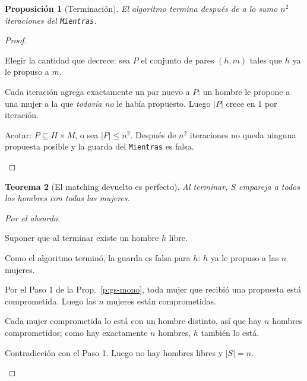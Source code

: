 \documentclass[11pt,a4paper]{article}
\theoremstyle{plain}
\newtheorem{teorema}{Teorema}[section]
\newtheorem{proposicion}[teorema]{Proposición}
\theoremstyle{definition}
\theoremstyle{remark}
\begin{document}
\begin{proposicion}[Terminación]
El algoritmo termina después de a lo sumo $n^2$ iteraciones del \texttt{Mientras}.
\end{proposicion}
\begin{proof}
\begin{pasos}
\item Elegir la cantidad que decrece: sea $P$ el conjunto de pares $(h,m)$ tales que $h$
ya le propuso a $m$.
\item Cada iteración agrega exactamente un par nuevo a $P$: un hombre le propone a una
mujer a la que \emph{todavía no} le había propuesto. Luego $|P|$ crece en $1$ por
iteración.
\item Acotar: $P\subseteq H\times M$, o sea $|P|\le n^2$. Después de $n^2$ iteraciones
no queda ninguna propuesta posible y la guarda del \texttt{Mientras} es falsa. \qedhere
\end{pasos}
\end{proof}

\begin{teorema}[El matching devuelto es perfecto]
Al terminar, $S$ empareja a todos los hombres con todas las mujeres.
\end{teorema}
\begin{proof}[Por el absurdo]
\begin{pasos}
\item Suponer que al terminar existe un hombre $h$ libre.
\item Como el algoritmo terminó, la guarda es falsa para $h$: $h$ ya le propuso a las
$n$ mujeres.
\item Por el Paso 1 de la Prop.~\ref{p:gs-mono}, toda mujer que recibió una propuesta
está comprometida. Luego las $n$ mujeres están comprometidas.
\item Cada mujer comprometida lo está con un hombre distinto, así que hay $n$ hombres
comprometidos; como hay exactamente $n$ hombres, $h$ también lo está.
\item Contradicción con el Paso 1. Luego no hay hombres libres y $|S|=n$. \qedhere
\end{pasos}
\end{proof}
\end{document}
